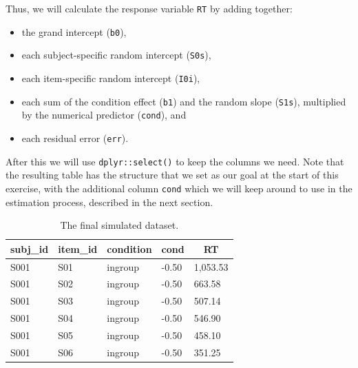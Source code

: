 \documentclass[man,floatsintext]{apa6}
\newenvironment{Shaded}{\begin{snugshade}}{\end{snugshade}}
\newcommand{\KeywordTok}[1]{\textcolor[rgb]{0.13,0.29,0.53}{\textbf{#1}}}
\newcommand{\DataTypeTok}[1]{\textcolor[rgb]{0.13,0.29,0.53}{#1}}
\newcommand{\StringTok}[1]{\textcolor[rgb]{0.31,0.60,0.02}{#1}}
\newcommand{\OperatorTok}[1]{\textcolor[rgb]{0.81,0.36,0.00}{\textbf{#1}}}
\newcommand{\NormalTok}[1]{#1}
\providecommand{\tightlist}{%
  \setlength{\itemsep}{0pt}\setlength{\parskip}{0pt}}
\begin{document}
Thus, we will calculate the response variable \texttt{RT} by adding
together:

\begin{itemize}
\tightlist
\item
  the grand intercept (\texttt{b0}),
\item
  each subject-specific random intercept (\texttt{S0s}),
\item
  each item-specific random intercept (\texttt{I0i}),
\item
  each sum of the condition effect (\texttt{b1}) and the random slope
  (\texttt{S1s}), multiplied by the numerical predictor (\texttt{cond}),
  and
\item
  each residual error (\texttt{err}).
\end{itemize}

After this we will use \texttt{dplyr::select()} to keep the columns we
need. Note that the resulting table has the structure that we set as our
goal at the start of this exercise, with the additional column
\texttt{cond} which we will keep around to use in the estimation
process, described in the next section.

\begin{Shaded}
\end{Shaded}

\begin{table}[tbp]
\begin{center}
\begin{threeparttable}
\caption{\label{tab:dat-sim-table}The final simulated dataset.}
\begin{tabular}{lllll}
\toprule
subj\_id & \multicolumn{1}{c}{item\_id} & \multicolumn{1}{c}{condition} & \multicolumn{1}{c}{cond} & \multicolumn{1}{c}{RT}\\
\midrule
S001 & S01 & ingroup & -0.50 & 1,053.53\\
S001 & S02 & ingroup & -0.50 & 663.58\\
S001 & S03 & ingroup & -0.50 & 507.14\\
S001 & S04 & ingroup & -0.50 & 546.90\\
S001 & S05 & ingroup & -0.50 & 458.10\\
S001 & S06 & ingroup & -0.50 & 351.25\\
\bottomrule
\end{tabular}
\end{threeparttable}
\end{center}
\end{table}
\end{document}
